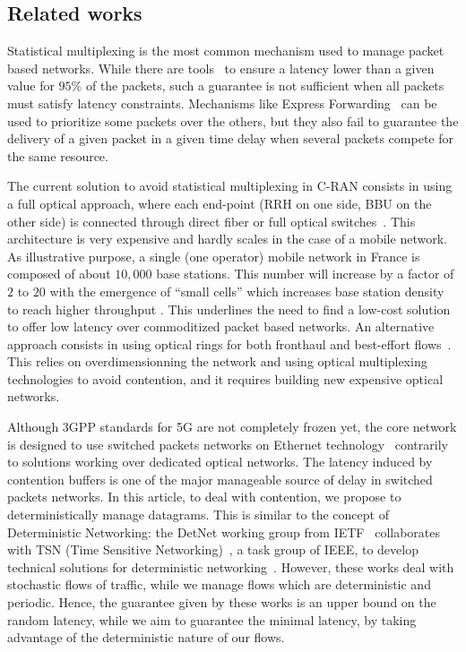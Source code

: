 \documentclass[a4paper,10pt]{journal}
\begin{document}
 \subsection*{Related works}

Statistical multiplexing is the most common mechanism used to manage packet based networks. While there are tools~\cite{metricsietf} to ensure a latency lower than a given value for $95\%$ of the packets, such a guarantee is not sufficient when all packets must satisfy latency constraints. Mechanisms like Express Forwarding~\cite{exprforw} can be used to prioritize some packets over the others, but they also fail to guarantee the delivery of a given packet in a given time delay when several packets compete for the same resource. 

The current solution to avoid statistical multiplexing in C-RAN consists in using a full optical approach, where each end-point (RRH on one side, BBU on the other side) is connected through direct fiber or full optical switches~\cite{kai2020amplify,tayq2017real}. This architecture is very expensive and hardly scales in the case of a mobile network. As illustrative purpose, a single (one operator) mobile network in France is composed of about $10,000$ base stations. This number will increase by a factor of $2$ to $20$ with the emergence of “small cells” which increases base station density to reach higher throughput \cite{dahlman20185g,romano2019imt}. This underlines the need to find a low-cost solution to offer low latency over commoditized packet based networks. 
An alternative approach consists in using optical rings for both fronthaul and best-effort flows~\cite{DBLP:conf/ondm/BarthGS19,rommel2020towards,luu2021dynamic}. This relies on overdimensionning the network and using optical multiplexing technologies to avoid contention, and it requires building new expensive optical networks.

Although 3GPP standards for 5G are not completely frozen yet, the core network is designed to use switched packets networks on Ethernet technology~\cite{ieee1914,gomes2015fronthaul}
contrarily to solutions working over dedicated optical networks. The latency induced by contention buffers is one of the major manageable source of delay in switched packets networks. In this article, to deal with contention, we propose to deterministically manage datagrams. This is similar to the concept of Deterministic Networking: the DetNet working group from IETF~\cite{finn-detnet-architecture-08} collaborates with TSN (Time Sensitive Networking)~\cite{ieee802}, a task group of IEEE, to develop technical solutions for deterministic networking~\cite{bhattacharjee2020time,8613095,durr2016no}. However, these works deal with stochastic flows of traffic, while we manage flows which are deterministic and periodic. Hence, the guarantee given by these works is an upper bound on the random latency, while we aim to guarantee the minimal latency, by taking advantage of the deterministic nature of our flows. %
\end{document}
